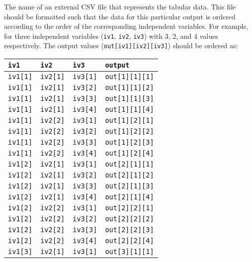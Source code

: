 The name of an external CSV file that represents the tabular data. This
file should be formatted such that the data for this particular output
is ordered according to the order of the corresponding independent
variables. For example, for three independent variables (\texttt{iv1},
\texttt{iv2}, \texttt{iv3}) with 3, 2, and 4 values respectively. The
output values (\texttt{out{[}iv1{]}{[}iv2{]}{[}iv3{]}}) should be
ordered as:

\begin{longtable}[]{@{}llll@{}}
\toprule
\texttt{iv1} & \texttt{iv2} & \texttt{iv3} &
\texttt{output}\tabularnewline
\midrule
\endhead
\texttt{iv1{[}1{]}} & \texttt{iv2{[}1{]}} & \texttt{iv3{[}1{]}} &
\texttt{out{[}1{]}{[}1{]}{[}1{]}}\tabularnewline
\texttt{iv1{[}1{]}} & \texttt{iv2{[}1{]}} & \texttt{iv3{[}2{]}} &
\texttt{out{[}1{]}{[}1{]}{[}2{]}}\tabularnewline
\texttt{iv1{[}1{]}} & \texttt{iv2{[}1{]}} & \texttt{iv3{[}3{]}} &
\texttt{out{[}1{]}{[}1{]}{[}3{]}}\tabularnewline
\texttt{iv1{[}1{]}} & \texttt{iv2{[}1{]}} & \texttt{iv3{[}4{]}} &
\texttt{out{[}1{]}{[}1{]}{[}4{]}}\tabularnewline
\texttt{iv1{[}1{]}} & \texttt{iv2{[}2{]}} & \texttt{iv3{[}1{]}} &
\texttt{out{[}1{]}{[}2{]}{[}1{]}}\tabularnewline
\texttt{iv1{[}1{]}} & \texttt{iv2{[}2{]}} & \texttt{iv3{[}2{]}} &
\texttt{out{[}1{]}{[}2{]}{[}2{]}}\tabularnewline
\texttt{iv1{[}1{]}} & \texttt{iv2{[}2{]}} & \texttt{iv3{[}3{]}} &
\texttt{out{[}1{]}{[}2{]}{[}3{]}}\tabularnewline
\texttt{iv1{[}1{]}} & \texttt{iv2{[}2{]}} & \texttt{iv3{[}4{]}} &
\texttt{out{[}1{]}{[}2{]}{[}4{]}}\tabularnewline
\texttt{iv1{[}2{]}} & \texttt{iv2{[}1{]}} & \texttt{iv3{[}1{]}} &
\texttt{out{[}2{]}{[}1{]}{[}1{]}}\tabularnewline
\texttt{iv1{[}2{]}} & \texttt{iv2{[}1{]}} & \texttt{iv3{[}2{]}} &
\texttt{out{[}2{]}{[}1{]}{[}2{]}}\tabularnewline
\texttt{iv1{[}2{]}} & \texttt{iv2{[}1{]}} & \texttt{iv3{[}3{]}} &
\texttt{out{[}2{]}{[}1{]}{[}3{]}}\tabularnewline
\texttt{iv1{[}2{]}} & \texttt{iv2{[}1{]}} & \texttt{iv3{[}4{]}} &
\texttt{out{[}2{]}{[}1{]}{[}4{]}}\tabularnewline
\texttt{iv1{[}2{]}} & \texttt{iv2{[}2{]}} & \texttt{iv3{[}1{]}} &
\texttt{out{[}2{]}{[}2{]}{[}1{]}}\tabularnewline
\texttt{iv1{[}2{]}} & \texttt{iv2{[}2{]}} & \texttt{iv3{[}2{]}} &
\texttt{out{[}2{]}{[}2{]}{[}2{]}}\tabularnewline
\texttt{iv1{[}2{]}} & \texttt{iv2{[}2{]}} & \texttt{iv3{[}3{]}} &
\texttt{out{[}2{]}{[}2{]}{[}3{]}}\tabularnewline
\texttt{iv1{[}2{]}} & \texttt{iv2{[}2{]}} & \texttt{iv3{[}4{]}} &
\texttt{out{[}2{]}{[}2{]}{[}4{]}}\tabularnewline
\texttt{iv1{[}3{]}} & \texttt{iv2{[}1{]}} & \texttt{iv3{[}1{]}} &
\texttt{out{[}3{]}{[}1{]}{[}1{]}}\tabularnewline

\end{longtable}
